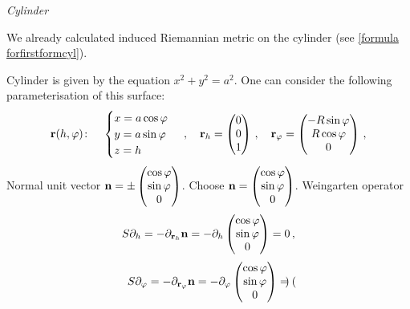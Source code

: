 \documentclass[12pt]{article}
\theoremstyle{theorem}
\numberwithin{equation}{section}
\begin{document}
{\m

{\it Cylinder}

\m

  We already calculated induced Riemannian metric on the cylinder (see \eqref {formula forfirstformcyl}).

 Cylinder is given by the equation $x^2+y^2=a^2$. 
One can consider the following
parameterisation
 of this surface:
\begin{equation}\label{surface11}
  {\bf r}(h,\varphi)\colon\quad
  \begin{cases}
  x=a\cos\varphi\\
  y=a\sin\varphi\\
  z=h\\
  \end{cases}\,,\quad   {\bf r}_h=
  \begin{pmatrix}
        0\\
        0\\
        1\\
   \end{pmatrix}\,,
\quad
  {\bf r}_\varphi=\begin{pmatrix}
        -R\sin\varphi\\
        R\cos\varphi\\
          0\\
   \end{pmatrix}\,,
\end{equation}
   Normal unit vector ${\bf n}=\pm \begin{pmatrix}
        \cos \varphi\cr
        \sin\varphi\cr
        0\cr
   \end{pmatrix}$. Choose ${\bf n}=\begin{pmatrix}
        \cos \varphi\cr
        \sin\varphi\cr
        0\cr
   \end{pmatrix}$. Weingarten operator
     \begin{equation*}\label{weingrartenforcylinder}
        S\partial_h=-\partial_{{\bf r}_h} {\bf n}=-\partial_h\begin{pmatrix}
        \cos \varphi\cr
        \sin\varphi\cr
        0\cr
   \end{pmatrix}=0\,,
     \end{equation*}
\begin{equation*}\label{weingrartenforcylinder}
        S\partial_\varphi=-\partial_{{\bf r}_\varphi} {\bf n}=-{\partial_\varphi}
        \begin{pmatrix}
        \cos \varphi\cr
        \sin\varphi\cr
        0\cr
   \end{pmatrix}=\begin{pmatrix}

\end{pmatrix}
\end{equation*}}
\end{document}
